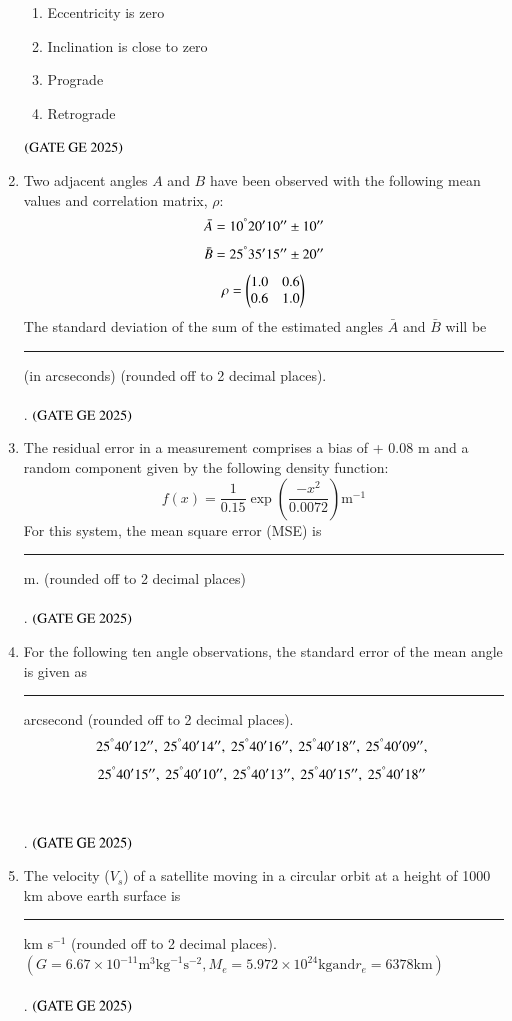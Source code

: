 \documentclass[journal,12pt,onecolumn]{IEEEtran}
\theoremstyle{remark}
\begin{document}
\begin{enumerate}
\begin{enumerate}
\item Eccentricity is zero
\item Inclination is close to zero
\item Prograde
\item Retrograde
\end{enumerate}
\hfill $\left(\text{GATE GE 2025}\right)$
\bigskip
\item Two adjacent angles $A$ and $B$ have been observed with the following mean values and correlation matrix, $\rho$:
\[
\bar{A} = 10^\degree20'10'' \pm 10''
\]
\[
\bar{B} = 25^\degree35'15'' \pm 20''
\]
\[
\rho = \begin{pmatrix}
1.0 & 0.6 \\
0.6 & 1.0\end{pmatrix}
\]
The standard deviation of the sum of the estimated angles $\bar{A}$ and $\bar{B}$ will be \rule{2cm}{0.5mm} (in arcseconds) (rounded off to 2 decimal places).
\\
\\.
\hfill $\left(\text{GATE GE 2025}\right)$
\bigskip
\item The residual error in a measurement comprises a bias of + 0.08 m and a random component given by the following density function:
\[
f(x) = \frac{1}{0.15} \exp \left( \frac{-x^2}{0.0072} \right)  \text{m}^{-1}
\]
For this system, the mean square error (MSE) is \rule{2cm}{0.5mm} m. (rounded off to 2 decimal places)
\\
\\.
\hfill $\left(\text{GATE GE 2025}\right)$
\bigskip
\item For the following ten angle observations, the standard error of the mean angle is given as \rule{2cm}{0.5mm} arcsecond (rounded off to 2 decimal places).
\[
25^\degree40'12'',\   25^\degree40'14'',\  25^\degree40'16'',\   25^\degree40'18'',\   25^\degree40'09'',\ 
\]
\[
25^\degree40'15'',\   25^\degree40'10'',\   25^\degree40'13'',\   25^\degree40'15'',\   25^\degree40'18''\ 
\]
\\
\\.
\hfill $\left(\text{GATE GE 2025}\right)$
\bigskip
\item The velocity ($V_s$) of a satellite moving in a circular orbit at a height of 1000 km above earth surface is \rule{2cm}{0.5mm} km s$^{-1}$ (rounded off to 2 decimal places).
\\
$(G = 6.67 \times 10^{-11}  \text{m}^3  \text{kg}^{-1}  \text{s}^{-2},  M_e = 5.972 \times 10^{24}  \text{kg}  \text{and}  r_e = 6378  \text{km})$
\\
\\.
\hfill $\left(\text{GATE GE 2025}\right)$

\end{enumerate}
\end{document}
